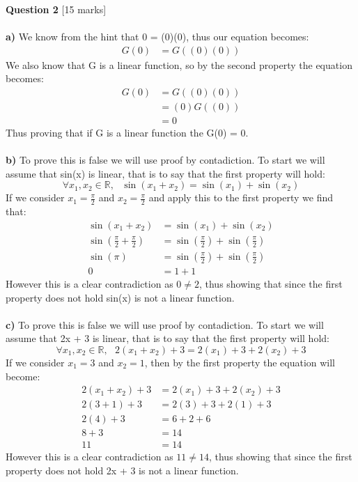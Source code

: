 \documentclass[11pt]{article}
\begin{document}
\textbf{Question 2} [15 marks] \\\\
\textbf{a)} We know from the hint that 0 = (0)(0), thus our equation becomes:
\begin{align*}
G(0) &= G((0)(0))
\end{align*}
We also know that G is a linear function, so by the second property the equation becomes:
\begin{align*}
G(0) &= G((0)(0))\\
       &= (0)G((0))\\
       &= 0
\end{align*}
Thus proving that if G is a linear function the G(0) = 0.\\\\
\textbf{b)} To prove this is false we will use proof by contadiction. To start we will assume that sin(x) is linear, that is to say that the first property will hold:
\[ \forall x_{1}, x_{2} \in \mathbb{R},\text{ } \sin(x_1 + x_2) = \sin(x_1) + \sin(x_2) \]
If we consider $x_{1} = \frac{\pi}{2}$ and $x_{2} = \frac{\pi}{2}$ and apply this to the first property we find that:
\begin{align*}
\sin(x_1 + x_2) &= \sin(x_1) + \sin(x_2)\\
\sin(\frac{\pi}{2} + \frac{\pi}{2}) &= \sin(\frac{\pi}{2}) + \sin(\frac{\pi}{2})\\
 \sin(\pi) &= \sin(\frac{\pi}{2}) + \sin(\frac{\pi}{2}) \\
0 &= 1 + 1
\end{align*}
However this is a clear contradiction as $0 \neq 2$, thus showing that since the first property does not hold sin(x) is not a linear function.\\\\
\textbf{c)} To prove this is false we will use proof by contadiction. To start we will assume that 2x + 3 is linear, that is to say that the first property will hold:
\[ \forall x_{1}, x_{2} \in \mathbb{R},\text{ } 2(x_1 + x_2) + 3 = 2(x_1) + 3 + 2(x_2)+3 \]
If we consider $x_{1} = 3$ and $x_{2} = 1$, then by the first property the equation will become:
\begin{align*}
2(x_1 + x_2) + 3 &= 2(x_1) + 3 + 2(x_2) + 3\\
2(3 + 1) + 3 &= 2(3) + 3 + 2(1) + 3\\
2(4) + 3 &= 6 +  2 + 6\\
8 + 3 &= 14\\
11 &= 14
\end{align*}
However this is a clear contradiction as $11 \neq 14$, thus showing that since the first property does not hold 2x + 3 is not a linear function.\\\\
\end{document}
